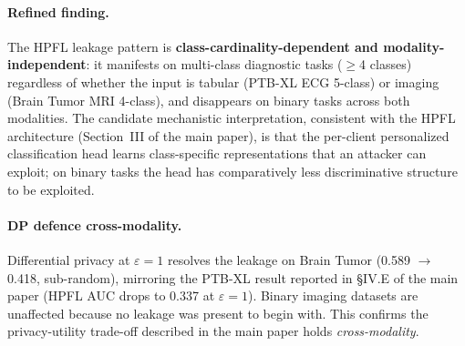 \documentclass[conference]{IEEEtran}
\begin{document}
\begin{table}[ht]
\centering
\caption{HPFL No-DP MIA AUC pooled across modality and class cardinality.}
\label{tab:s-prerebuttal-7-pool}
\small
{}
\end{table}

\paragraph{Refined finding.} The HPFL leakage pattern is \textbf{class-cardinality-dependent and modality-independent}: it manifests on multi-class diagnostic tasks ($\geq$4 classes) regardless of whether the input is tabular (PTB-XL ECG 5-class) or imaging (Brain Tumor MRI 4-class), and disappears on binary tasks across both modalities. The candidate mechanistic interpretation, consistent with the HPFL architecture (Section~III of the main paper), is that the per-client personalized classification head learns class-specific representations that an attacker can exploit; on binary tasks the head has comparatively less discriminative structure to be exploited.

\paragraph{DP defence cross-modality.} Differential privacy at $\varepsilon{=}1$ resolves the leakage on Brain Tumor (0.589 $\to$ 0.418, sub-random), mirroring the PTB-XL result reported in §IV.E of the main paper (HPFL AUC drops to 0.337 at $\varepsilon{=}1$). Binary imaging datasets are unaffected because no leakage was present to begin with. This confirms the privacy-utility trade-off described in the main paper holds \emph{cross-modality}.
\end{document}
